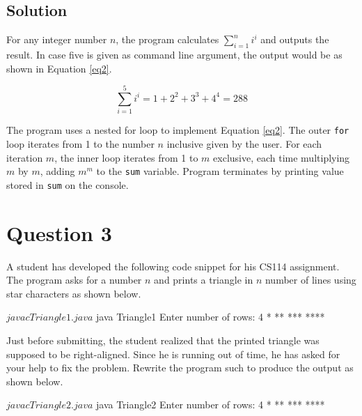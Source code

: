 \documentclass[12pt,letterpaper,twoside]{article}
\begin{document}


\subsection*{Solution}

For any integer number $n$, the program calculates $\sum\limits_{i=1}^n i^i$ and outputs the result.
In case five is given as command line argument, the output would be as shown in Equation \ref{eq2}.

\begin{equation}
\sum\limits_{i=1}^5 i^i = 1 + 2^2 + 3^3 + 4^4 = 288
\label{eq2}
\end{equation}

The program uses a nested for loop to implement Equation \ref{eq2}.
The outer \texttt{for} loop iterates from 1 to the number $n$ inclusive given by the user.
For each iteration $m$, the inner loop iterates from 1 to $m$ exclusive, each time multiplying $m$ by $m$, adding $m^m$ to the \texttt{sum} variable.
Program terminates by printing value stored in \texttt{sum} on the console.

\newpage

\section*{Question 3}

A student has developed the following code snippet for his CS114 assignment.
The program asks for a number $n$ and prints a triangle in $n$ number of lines
using star characters as shown below.



\begin{terminal}
$ javac Triangle1.java
$ java Triangle1
Enter number of rows: 4
*
**
***
****
\end{terminal}

Just before submitting, the student realized that the printed triangle was supposed to be right-aligned.
Since he is running out of time, he has asked for your help to fix the problem.
Rewrite the program such to produce the output as shown below.

\begin{terminal}
$ javac Triangle2.java
$ java Triangle2
Enter number of rows: 4
   *
  **
 ***
****
\end{terminal}
\end{document}

